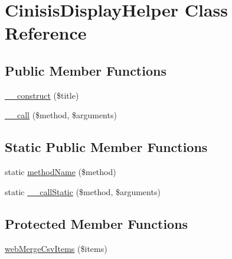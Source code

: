\hypertarget{classCinisisDisplayHelper}{
\section{CinisisDisplayHelper Class Reference}
\label{classCinisisDisplayHelper}
}
\subsection*{Public Member Functions}
\begin{DoxyCompactItemize}
\item 
\hyperlink{classCinisisDisplayHelper_ae60a4cc7ad15109c83b3d934f89b283e}{\_\-\_\-construct} (\$title)
\item 
\hyperlink{classCinisisDisplayHelper_a5601da7181ece90313c1abe2fd0ae621}{\_\-\_\-call} (\$method, \$arguments)
\end{DoxyCompactItemize}
\subsection*{Static Public Member Functions}
\begin{DoxyCompactItemize}
\item 
static \hyperlink{classCinisisDisplayHelper_ab263cf81e5c459c60baa6ef7fa5f76b2}{methodName} (\$method)
\item 
static \hyperlink{classCinisisDisplayHelper_abae906d7606b7d76ef5ed754835ba7e2}{\_\-\_\-callStatic} (\$method, \$arguments)
\end{DoxyCompactItemize}
\subsection*{Protected Member Functions}
\begin{DoxyCompactItemize}
\item 
\hyperlink{classCinisisDisplayHelper_a6c4042683e787ae54cd9e0c88c83606c}{webMergeCsvItems} (\$items)
\end{DoxyCompactItemize}
